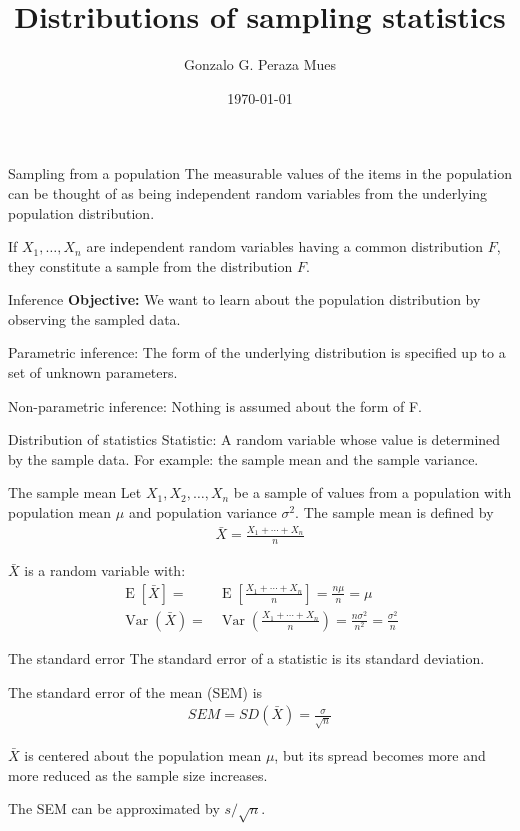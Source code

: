 \documentclass{beamer}
\title{Distributions of sampling statistics}
\date{\today}
\author{Gonzalo G. Peraza Mues}
\newcommand{\E}[1]{\operatorname{E}\left[#1\right]}
\newcommand{\Var}[1]{\operatorname{Var}\left(#1\right)}
\begin{document}
\maketitle
\begin{frame}{Sampling from a population}
  The measurable values of the items in the population can be thought of as
  being independent random variables from the underlying population
  distribution.

  If $X_1,\ldots,X_n$ are independent random variables having a common
  distribution $F$, they constitute a \alert{sample} from the distribution $F$.
\end{frame}

\begin{frame}{Inference}
  \textbf{Objective:} We want to learn about the population distribution by
  observing the sampled data.

  \alert{Parametric inference}: The form of the underlying distribution
  is specified up to a set of unknown parameters.

  \alert{Non-parametric inference}: Nothing is assumed about the form of F.
\end{frame}

\begin{frame}{Distribution of statistics}
  \alert{Statistic}: A random variable whose value is determined by the sample
  data. For example: the sample mean and the sample variance.
\end{frame}

\begin{frame}{The sample mean}
  Let $X_1,X_2,\ldots,X_n$ be a sample of values from a population with
  \alert{population mean} $\mu$ and \alert{population variance} $\sigma^2$. The
  sample mean is defined by
  \begin{align*}
    \bar{X} = \frac{X_1+\cdots+X_n}{n}
  \end{align*}

  $\bar{X}$ is a random variable with:
  \begin{align*}
    \E{\bar{X}} =& \E{\frac{X_1+\cdots+X_n}{n}} = \frac{n\mu}{n} = \mu\\
    \Var{\bar{X}} = & \Var{\frac{X_1+\cdots+X_n}{n}} = \frac{n\sigma^2}{n^2}
                      = \frac{\sigma^2}{n}
  \end{align*}
\end{frame}

\begin{frame}{The standard error}
  The standard error of a statistic is its standard deviation.

  The standard error of the mean (\alert{SEM}) is
  \begin{align*}
    SEM = SD(\bar{X}) = \frac{\sigma}{\sqrt{n}}
  \end{align*}

  $\bar{X}$ is centered about the population mean $\mu$, but its spread becomes
  more and more reduced as the sample size increases.

  The SEM can be approximated by $s/\sqrt{n}$.
\end{frame}
\end{document}
